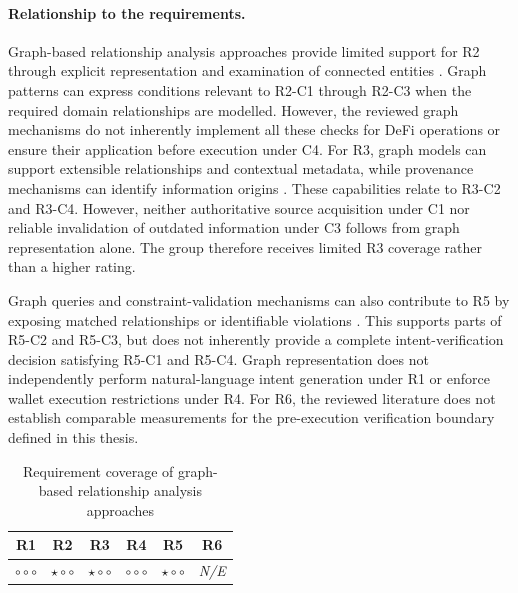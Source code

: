 \paragraph{Relationship to the requirements.}

Graph-based relationship analysis approaches provide
limited support for R2 through explicit representation
and examination of connected entities
\cite{anglesPropertyGraphModel2018,francisCypher2018}.
Graph patterns can express conditions relevant to
R2-C1 through R2-C3 when the required domain
relationships are modelled. However, the reviewed
graph mechanisms do not inherently implement all
these checks for DeFi operations or ensure their
application before execution under C4. For R3, graph models can support extensible
relationships and contextual metadata, while
provenance mechanisms can identify information origins
\cite{hoganKnowledgeGraphs2021,w3cPROVO2013}.
These capabilities relate to R3-C2 and R3-C4.
However, neither authoritative source acquisition
under C1 nor reliable invalidation of outdated
information under C3 follows from graph representation
alone. The group therefore receives limited R3
coverage rather than a higher rating.

Graph queries and constraint-validation mechanisms
can also contribute to R5 by exposing matched
relationships or identifiable violations
\cite{francisCypher2018,w3cSHACL2017}.
This supports parts of R5-C2 and R5-C3, but does not
inherently provide a complete intent-verification
decision satisfying R5-C1 and R5-C4. Graph representation does not independently perform
natural-language intent generation under R1 or enforce
wallet execution restrictions under R4. For R6,
the reviewed literature does not establish comparable
measurements for the pre-execution verification
boundary defined in this thesis.

\begin{table}[H]
\centering
\renewcommand{\arraystretch}{1.3}
\begin{tabular}{cccccc}
\hline
\textbf{R1} & \textbf{R2} & \textbf{R3} &
\textbf{R4} & \textbf{R5} & \textbf{R6} \\
\hline

$\circ\circ\circ$ &
$\star\circ\circ$ &
$\star\circ\circ$ &
$\circ\circ\circ$ &
$\star\circ\circ$ &
\textit{N/E} \\

\hline
\end{tabular}
\caption{Requirement coverage of graph-based
relationship analysis approaches}
\label{tab:req_graph_structured}
\end{table}


